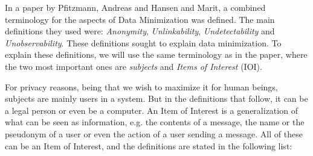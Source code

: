


In a paper by Pfitzmann, Andreas and Hansen and Marit, a combined terminology for the aspects of Data Minimization was defined. The main definitions they used were: \textit{Anonymity}, \textit{Unlinkability}, \textit{Undetectability} and \textit{Unobservability}\cite{pfitzmann2010z}. These definitions sought to explain data minimization. To explain these definitions, we will use the same terminology as in the paper, where the two most important ones are \textit{subjects} and \textit{Items of Interest} (IOI). 

For privacy reasons, being that we wish to maximize it for human beings, subjects are mainly users in a system. But in the definitions that follow, it can be a legal person or even be a computer. An Item of Interest is a generalization of what can be seen as information, e.g. the contents of a message, the name or the pseudonym of a user or even the action of a user sending a message. All of these can be an Item of Interest, and the definitions are stated in the following list: \\




